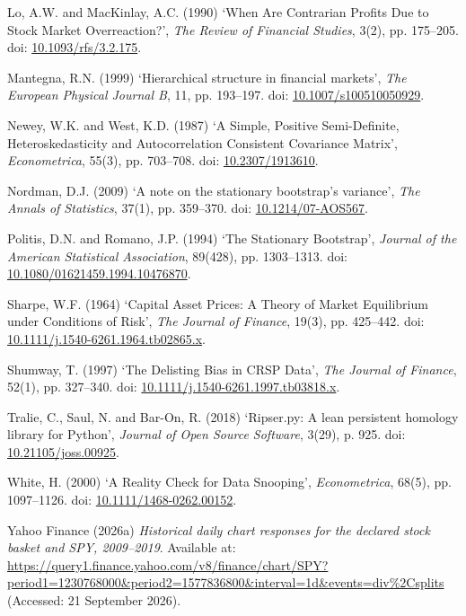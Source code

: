 \documentclass[12pt,a4paper,oneside]{article}
\newcommand{\refentry}[1]{\par\begingroup\hangindent=7mm\hangafter=1 #1\par\endgroup\vspace{4pt}}
\begin{document}
\refentry{Lo, A.W. and MacKinlay, A.C. (1990) ‘When Are Contrarian Profits Due to Stock Market Overreaction?’, \textit{The Review of Financial Studies}, 3(2), pp. 175–205. doi: \href{https://doi.org/10.1093/rfs/3.2.175}{10.1093/rfs/3.2.175}.}

\refentry{Mantegna, R.N. (1999) ‘Hierarchical structure in financial markets’, \textit{The European Physical Journal B}, 11, pp. 193–197. doi: \href{https://doi.org/10.1007/s100510050929}{10.1007/s100510050929}.}

\refentry{Newey, W.K. and West, K.D. (1987) ‘A Simple, Positive Semi-Definite, Heteroskedasticity and Autocorrelation Consistent Covariance Matrix’, \textit{Econometrica}, 55(3), pp. 703–708. doi: \href{https://doi.org/10.2307/1913610}{10.2307/1913610}.}

\refentry{Nordman, D.J. (2009) ‘A note on the stationary bootstrap's variance’, \textit{The Annals of Statistics}, 37(1), pp. 359–370. doi: \href{https://doi.org/10.1214/07-AOS567}{10.1214/07-AOS567}.}

\refentry{Politis, D.N. and Romano, J.P. (1994) ‘The Stationary Bootstrap’, \textit{Journal of the American Statistical Association}, 89(428), pp. 1303–1313. doi: \href{https://doi.org/10.1080/01621459.1994.10476870}{10.1080/01621459.1994.10476870}.}

\refentry{Sharpe, W.F. (1964) ‘Capital Asset Prices: A Theory of Market Equilibrium under Conditions of Risk’, \textit{The Journal of Finance}, 19(3), pp. 425–442. doi: \href{https://doi.org/10.1111/j.1540-6261.1964.tb02865.x}{10.1111/j.1540-6261.1964.tb02865.x}.}

\refentry{Shumway, T. (1997) ‘The Delisting Bias in CRSP Data’, \textit{The Journal of Finance}, 52(1), pp. 327–340. doi: \href{https://doi.org/10.1111/j.1540-6261.1997.tb03818.x}{10.1111/j.1540-6261.1997.tb03818.x}.}

\refentry{Tralie, C., Saul, N. and Bar-On, R. (2018) ‘Ripser.py: A lean persistent homology library for Python’, \textit{Journal of Open Source Software}, 3(29), p. 925. doi: \href{https://doi.org/10.21105/joss.00925}{10.21105/joss.00925}.}

\refentry{White, H. (2000) ‘A Reality Check for Data Snooping’, \textit{Econometrica}, 68(5), pp. 1097–1126. doi: \href{https://doi.org/10.1111/1468-0262.00152}{10.1111/1468-0262.00152}.}

\refentry{Yahoo Finance (2026a) \textit{Historical daily chart responses for the declared stock basket and SPY, 2009–2019}. Available at: \url{https://query1.finance.yahoo.com/v8/finance/chart/SPY?period1=1230768000&period2=1577836800&interval=1d&events=div\%2Csplits} (Accessed: 21 September 2026).}
\end{document}
